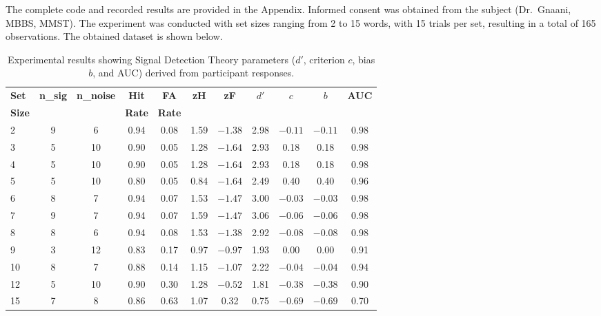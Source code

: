 The complete code and recorded results are provided in the Appendix. Informed consent was obtained from the subject (Dr.~Gnaani, MBBS, MMST). The experiment was conducted with set sizes ranging from 2 to 15 words, with 15 trials per set, resulting in a total of 165 observations. The obtained dataset is shown below.

\begin{table}[H]
    \centering
    \caption{Experimental results showing Signal Detection Theory parameters ($d'$, criterion $c$, bias $b$, and AUC) derived from participant responses.}
    \label{tab:dataset}
    \small
    \begin{tabular}{lcccccccccc}
        \toprule
        \textbf{Set} & \textbf{n\_sig} & \textbf{n\_noise} & \textbf{Hit} & \textbf{FA} & \textbf{zH} & \textbf{zF} & \textbf{$d'$} & \textbf{$c$} & \textbf{$b$} & \textbf{AUC} \\
        \textbf{Size} & & & \textbf{Rate} & \textbf{Rate} & & & & & & \\
        \midrule
        2  & 9 & 6  & 0.94 & 0.08 & 1.59 & $-1.38$ & 2.98 & $-0.11$ & $-0.11$ & 0.98 \\
        3  & 5 & 10 & 0.90 & 0.05 & 1.28 & $-1.64$ & 2.93 & 0.18  & 0.18  & 0.98 \\
        4  & 5 & 10 & 0.90 & 0.05 & 1.28 & $-1.64$ & 2.93 & 0.18  & 0.18  & 0.98 \\
        5  & 5 & 10 & 0.80 & 0.05 & 0.84 & $-1.64$ & 2.49 & 0.40  & 0.40  & 0.96 \\
        6  & 8 & 7  & 0.94 & 0.07 & 1.53 & $-1.47$ & 3.00 & $-0.03$ & $-0.03$ & 0.98 \\
        7  & 9 & 7  & 0.94 & 0.07 & 1.59 & $-1.47$ & 3.06 & $-0.06$ & $-0.06$ & 0.98 \\
        8  & 8 & 6  & 0.94 & 0.08 & 1.53 & $-1.38$ & 2.92 & $-0.08$ & $-0.08$ & 0.98 \\
        9  & 3 & 12 & 0.83 & 0.17 & 0.97 & $-0.97$ & 1.93 & 0.00  & 0.00  & 0.91 \\
        10 & 8 & 7  & 0.88 & 0.14 & 1.15 & $-1.07$ & 2.22 & $-0.04$ & $-0.04$ & 0.94 \\
        12 & 5 & 10 & 0.90 & 0.30 & 1.28 & $-0.52$ & 1.81 & $-0.38$ & $-0.38$ & 0.90 \\
        15 & 7 & 8  & 0.86 & 0.63 & 1.07 & 0.32  & 0.75 & $-0.69$ & $-0.69$ & 0.70 \\
        \bottomrule
    \end{tabular}
\end{table}

